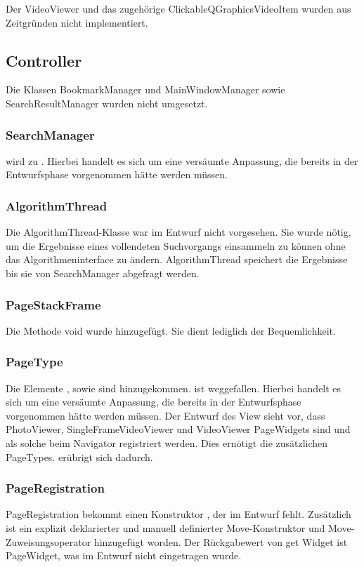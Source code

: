 Der VideoViewer und das zugehörige ClickableQGraphicsVideoItem wurden aus Zeitgründen nicht implementiert.

\subsection{Controller}
Die Klassen BookmarkManager und MainWindowManager sowie SearchResultManager wurden nicht umgesetzt.

\subsubsection{SearchManager}
 wird zu . Hierbei handelt es sich um eine versäumte Anpassung, die bereits in der Entwurfsphase vorgenommen hätte werden müssen.

\subsubsection{AlgorithmThread}
Die AlgorithmThread-Klasse war im Entwurf nicht vorgesehen. Sie wurde nötig, um die Ergebnisse eines vollendeten Suchvorgangs einsammeln zu können ohne das Algorithmeninterface zu ändern. AlgorithmThread speichert die Ergebnisse bis sie von SearchManager abgefragt werden.

\subsubsection{PageStackFrame}
Die Methode void  wurde hinzugefügt. Sie dient lediglich der Bequemlichkeit.

\subsubsection{PageType}
Die Elemente ,  sowie  sind hinzugekommen.  ist weggefallen. Hierbei handelt es sich um eine versäumte Anpassung, die bereits in der Entwurfsphase vorgenommen hätte werden müssen. Der Entwurf des View sieht vor, dass PhotoViewer, SingleFrameVideoViewer und VideoViewer PageWidgets sind und als solche beim Navigator registriert werden. Dies ernötigt die zusätzlichen PageTypes.  erübrigt sich dadurch.

\subsubsection{PageRegistration}
PageRegistration bekommt einen Konstruktor , der im Entwurf fehlt. Zusätzlich ist ein explizit deklarierter und manuell definierter Move-Konstruktor und Move-Zuweisungsoperator hinzugefügt worden. Der Rückgabewert von get Widget ist PageWidget, was im Entwurf nicht eingetragen wurde.

